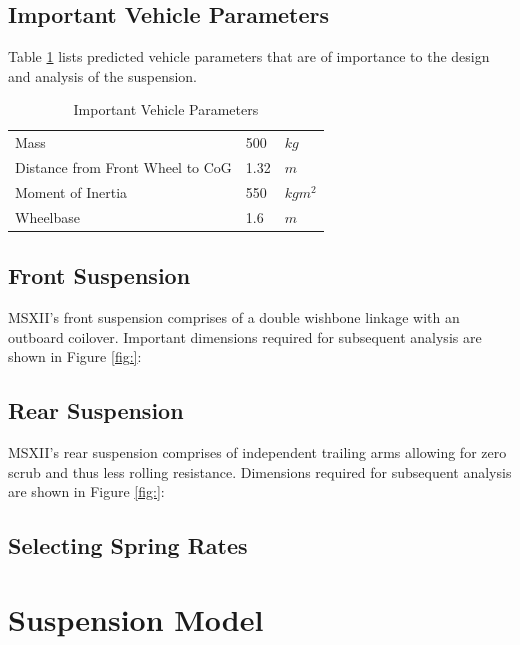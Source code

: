\documentclass[12pt]{article}
\begin{document}
\subsection{Important Vehicle Parameters}
Table \ref{tab:params} lists predicted vehicle parameters that are of importance to the design and analysis of the suspension. 
\begin{table}[]
	\centering
	\caption{Important Vehicle Parameters}
	\label{tab:params}
	\begin{tabular}{lll}
	Mass                             & 500  & $kg$                    \\
	Distance from Front Wheel to CoG & 1.32 & $m$                     \\
	Moment of Inertia                & 550  & $kgm^2$ \\
	Wheelbase                        & 1.6  & $m$                    
	\end{tabular}
\end{table}
\subsection{Front Suspension} 
MSXII's front suspension comprises of a double wishbone linkage with an outboard coilover. Important dimensions required for subsequent analysis are shown in Figure \ref{fig:}:

\subsection{Rear Suspension} 
MSXII's rear suspension comprises of independent trailing arms allowing for zero scrub and thus less rolling resistance. Dimensions required for subsequent analysis are shown in Figure \ref{fig:}:

\subsection{Selecting Spring Rates}

\section{Suspension Model}
\end{document}
